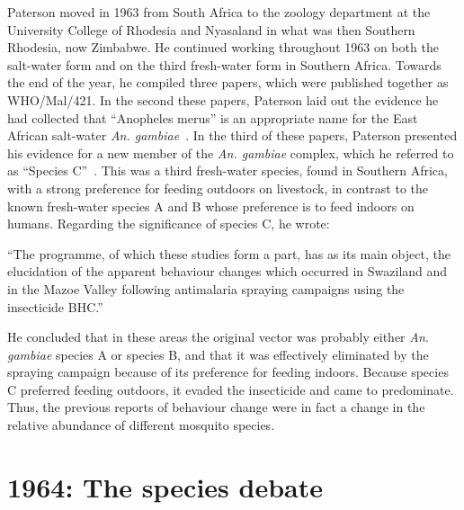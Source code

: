\documentclass[a4paper,11pt,abstracton,hidelinks]{scrartcl}
\begin{document}
Paterson moved in 1963 from South Africa to the zoology department at the University College of Rhodesia and Nyasaland in what was then Southern Rhodesia, now Zimbabwe.
%
He continued working throughout 1963 on both the salt-water form and on the third fresh-water form in Southern Africa.
%
Towards the end of the year, he compiled three papers, which were published together as WHO/Mal/421.
%
In the second these papers, Paterson laid out the evidence he had collected that ``Anopheles merus'' is an appropriate name for the East African salt-water \textit{An. gambiae}~\parencite{Paterson1963a}.
%
In the third of these papers, Paterson presented his evidence for a new member of the \textit{An. gambiae} complex, which he referred to as ``Species C''~\parencite{Paterson1963b}.
%
This was a third fresh-water species, found in Southern Africa, with a strong preference for feeding outdoors on livestock, in contrast to the known fresh-water species A and B whose preference is to feed indoors on humans.
%
Regarding the significance of species C, he wrote:


\begin{displayquote}
``The programme, of which these studies form a part, has as its main object, the elucidation of the apparent behaviour changes which occurred in Swaziland and in the Mazoe Valley following antimalaria spraying campaigns using the insecticide BHC.''~\parencite{Paterson1963b}
\end{displayquote}


He concluded that in these areas the original vector was probably either \textit{An. gambiae} species A or species B, and that it was effectively eliminated by the spraying campaign because of its preference for feeding indoors.
%
Because species C preferred feeding outdoors, it evaded the insecticide and came to predominate.
%
Thus, the previous reports of behaviour change were in fact a change in the relative abundance of different mosquito species.


\section{1964: The species debate}\label{sec:1964}
\end{document}
